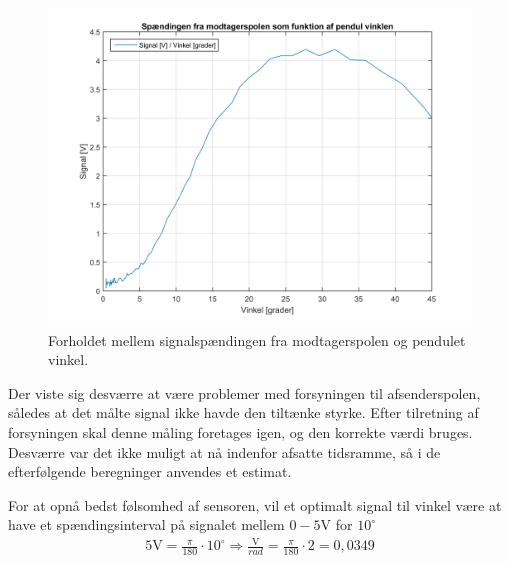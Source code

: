 \begin{figure}[h!]
	\centering
	\includegraphics[width=.7\textwidth]{billeder/pendul_fald_res.png}
	\caption{Forholdet mellem signalspændingen fra modtagerspolen og pendulet vinkel.}
	\label{fig:pendul_fald_res}
\end{figure}
\FloatBlock
Der viste sig desværre at være problemer med forsyningen til afsenderspolen, således at det målte signal ikke havde den tiltænke styrke.
Efter tilretning af forsyningen skal denne måling foretages igen, og den korrekte værdi bruges.
Desværre var det ikke muligt at nå indenfor afsatte tidsramme, så i de efterfølgende beregninger anvendes et estimat.

For at opnå bedst følsomhed af sensoren, vil et optimalt signal til vinkel være at have et spændingsinterval på signalet mellem $0-5\si{\volt}$ for $10^{\circ}$ 
\begin{align}
5\si{\volt} = \frac{\pi}{180} \cdot 10^{\circ} \Rightarrow \frac{\si{\volt}}{rad} = \frac{\pi}{180} \cdot 2 = 0,0349
\end{align}


